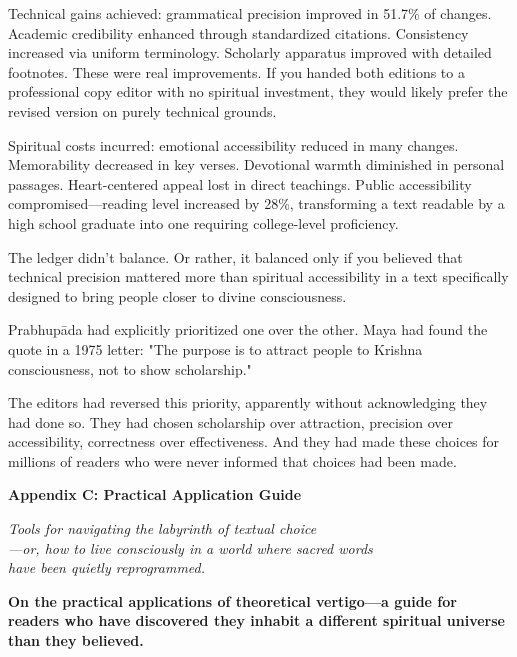 \documentclass[12pt,twoside]{book}
\begin{document}
Technical gains achieved: grammatical precision improved in 51.7\% of changes. Academic credibility enhanced through standardized citations. Consistency increased via uniform terminology. Scholarly apparatus improved with detailed footnotes. These were real improvements. If you handed both editions to a professional copy editor with no spiritual investment, they would likely prefer the revised version on purely technical grounds.

Spiritual costs incurred: emotional accessibility reduced in many changes. Memorability decreased in key verses. Devotional warmth diminished in personal passages. Heart-centered appeal lost in direct teachings. Public accessibility compromised—reading level increased by 28\%, transforming a text readable by a high school graduate into one requiring college-level proficiency.

The ledger didn't balance. Or rather, it balanced only if you believed that technical precision mattered more than spiritual accessibility in a text specifically designed to bring people closer to divine consciousness.

Prabhupāda had explicitly prioritized one over the other. Maya had found the quote in a 1975 letter: "The purpose is to attract people to Krishna consciousness, not to show scholarship."

The editors had reversed this priority, apparently without acknowledging they had done so. They had chosen scholarship over attraction, precision over accessibility, correctness over effectiveness. And they had made these choices for millions of readers who were never informed that choices had been made.

\clearpage
\thispagestyle{empty}
\mbox{}
\newpage
\pagestyle{sectionopening}
\thispagestyle{sectionopening}
\markboth{}{}
\markright{}
\vspace*{0.25\textheight}
\begin{center}
{\Huge\bfseries Appendix C: Practical Application Guide}
\end{center}
\newpage

{\centering\itshape Tools for navigating the labyrinth of textual choice\\—or, how to live consciously in a world where sacred words\\have been quietly reprogrammed.\par}
\vspace{0.3cm}

\normalfont\justifying
\textbf{On the practical applications of theoretical vertigo—a guide for readers who have discovered they inhabit a different spiritual universe than they believed.}
\end{document}
